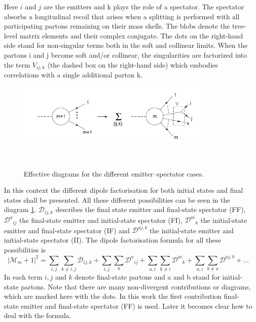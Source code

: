 Here $i$ and $j$ are the emitters and k plays the role of a spectator. The spectator absorbs a longitudinal recoil that arises when a splitting is performed with  all  participating  partons  remaining  on  their  mass  shells. The blobs denote the tree-level matrix elements and their complex conjugate. The dots on the right-hand side stand for non-singular terms both in the soft and collinear limits.
When the partons i and j become soft and/or collinear, the singularities are factorized into the term $ V_{ij,k} $ (the
dashed box on the right-hand side) which embodies correlations with a single additional parton k.

\begin{figure}[h!]
\centering
\includegraphics[width=0.85\textwidth]{images/Intro/factorisationPic2.png}
\caption{Effective diagrams for the different emitter–spectator cases.}
\label{factorisationPic2}
~\cite{Catani:2002hc}
\end{figure}

In this context the different dipole factorisation for both initial states and final states shall be presented. All these different possibilities can be seen in the diagram \ref{factorisationPic2}.
$  \mathcal{D}_{ij,k} $ describes the final state emitter and final-state spectator (FF), $  {\mathcal{D}^a}_{ij} $ the final-state emitter and initial-state spectator (FI), $ {\mathcal{D}^{ai}}_{k} $ the initial-state emitter and final-state spectator (IF) and $ \mathcal{D}^{aj,b} $ the initial-state emitter and initial-state spectator (II).
The dipole factorisation formula for all these possibilities is \cite{Schumann:2007mg}
 \begin{equation}
 |\mathcal{M}_m+1|^2 = \displaystyle\sum\limits_{i,j} \displaystyle\sum\limits_{k\neq i,j} \mathcal{D}_{ij,k} +\displaystyle\sum\limits_{i,j} \displaystyle\sum\limits_{a} {\mathcal{D}^a}_{ij}+\displaystyle\sum\limits_{a,i} \displaystyle\sum\limits_{k\neq i} {\mathcal{D}^{ai}}_{k}+\displaystyle\sum\limits_{a,i} \displaystyle\sum\limits_{b\neq a} \mathcal{D}^{aj,b}+...
 \end{equation}
In each term $ i, j $ and $ k $ denote final-state partons and a and b stand for initial-state partons. Note that there are many non-divergent contributions or diagrams, which are marked here with the dots. In this work the first contribution final-state emitter and final-state spectator (FF) is used. Later it becomes clear how to deal with the formula.

